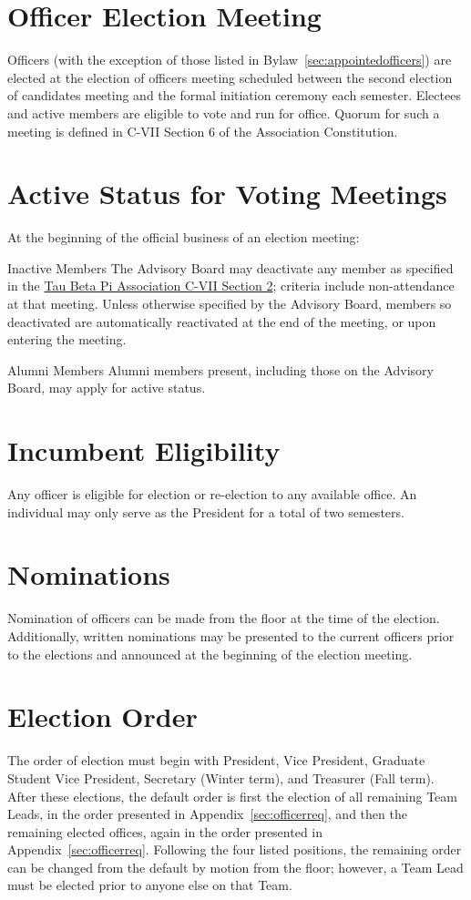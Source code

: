 \section{Officer Election Meeting}\label{sec:elecMeeting}
Officers (with the exception of those listed in Bylaw~\ref{sec:appointedofficers}) are elected at the election of officers meeting scheduled between the second election of candidates meeting and the formal initiation ceremony each semester.
Electees and active members are eligible to vote and run for office.
Quorum for such a meeting is defined in C-VII Section 6 of the Association Constitution.
\section{Active Status for Voting Meetings}\label{sec:elecQuorum}
At the beginning of the official business of an election meeting:
\begin{enumsubsection}
\item*{Inactive Members}
The Advisory Board may deactivate any member as specified in the \href{http://www.tbp.org/off/ConstBylaw.pdf}{Tau Beta Pi Association C-VII Section 2}; criteria include non-attendance at that meeting.
Unless otherwise specified by the Advisory Board, members so deactivated are automatically reactivated at the end of the meeting, or upon entering the meeting.
\item*{Alumni Members}
Alumni members present, including those on the Advisory Board, may apply for active status.
\end{enumsubsection}
\section{Incumbent Eligibility}
Any officer is eligible for election or re-election to any available office.
An individual may only serve as the President for a total of two semesters.
\section{Nominations}
Nomination of officers can be made from the floor at the time of the election.
Additionally, written nominations may be presented to the current officers prior to the elections and announced at the beginning of the election meeting.
\section{Election Order}
The order of election must begin with President, Vice President, Graduate Student Vice President, Secretary (Winter term), and Treasurer (Fall term).
After these elections, the default order is first the election of all remaining Team Leads, in the order presented in Appendix~\ref{sec:officerreq}, and then the remaining elected offices, again in the order presented in Appendix~\ref{sec:officerreq}.
Following the four listed positions, the remaining order can be changed from the default by motion from the floor; however, a Team Lead must be elected prior to anyone else on that Team.
